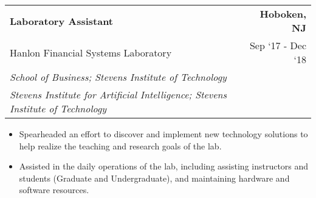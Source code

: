 \documentclass[10pt, letterpaper]{letter}
\begin{document}
        \begin{tabularx}{\textwidth}{X r}
            \textbf{Laboratory Assistant} & \textbf{Hoboken, 
        NJ} \\
            Hanlon Financial Systems Laboratory & 
        
    Sep ‘17 - 
    Dec ‘18 \\
            
                \textit{School of Business; Stevens Institute of Technology} & \\
            
                \textit{Stevens Institute for Artificial Intelligence; Stevens Institute of Technology} & \\
            
            
        \end{tabularx}
        \vspace{-1em}
        \begin{itemize}[noitemsep, topsep=0pt, parsep=0pt, partopsep=0pt]
            
                \item 
    Spearheaded an effort to discover and implement new technology solutions to help realize the teaching and research goals of the lab.
            
                \item 
    Assisted in the daily operations of the lab, including assisting instructors and students (Graduate and Undergraduate), and maintaining hardware and software resources.
            
        \end{itemize}
    
\end{document}
